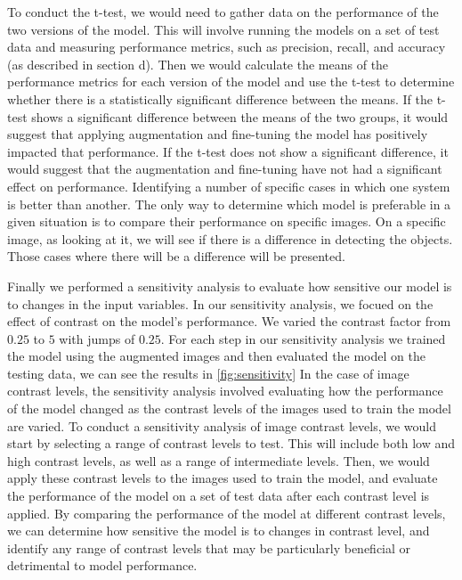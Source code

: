 \documentclass{article}
\begin{document}
To conduct the t-test, we would need to gather data on the performance of the two versions of the model. This will involve running the 
models on a set of test data and measuring performance metrics, such as precision, recall, and accuracy 
(as described in section d). Then we would calculate the means of the performance metrics for each version of the 
model and use the t-test to determine whether there is a statistically significant difference between the means.
If the t-test shows a significant difference between the means of the two groups, it would suggest that applying 
augmentation and fine-tuning the model has positively impacted that performance. If the t-test does not show a 
significant difference, it would suggest that the augmentation and fine-tuning have not had a significant effect on performance.
Identifying a number of specific cases in which one system is better than another.
The only way to determine which model is preferable in a given situation is to compare their performance on specific images.
On a specific image, as looking at it, we will see if there is a difference in detecting the objects. Those cases where there will be a difference will be presented.


Finally we performed a sensitivity analysis to evaluate how sensitive our model is to changes in the input variables. In our sensitivity analysis, 
we focued on the effect of contrast on the model’s performance.
We varied the contrast factor from \(0.25\) to \(5\) with jumps of \(0.25\).
For each step in our sensitivity analysis we trained the model using the augmented images and then evaluated the model
on the testing data, we can see the results in \ref*{fig:sensitivity}
In the case of image contrast levels, the sensitivity analysis involved evaluating how the performance of 
the model changed as the contrast levels of the images used to train the model are varied.
To conduct a sensitivity analysis of image contrast levels, we would start by selecting a range of contrast levels to test. 
This will include both low and high contrast levels, as well as a range of intermediate levels. 
Then, we would apply these contrast levels to the images used to train the model, and evaluate the performance of the model on a set of test data after each contrast level is applied.
By comparing the performance of the model at different contrast levels, we can determine how sensitive the model is to changes in contrast level, 
and identify any range of contrast levels that may be particularly beneficial or detrimental to model performance.
\end{document}
